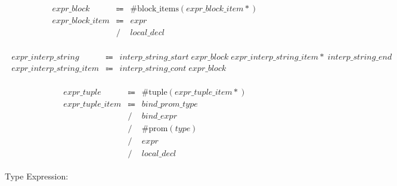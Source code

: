 \begin{align*}
    \begin{array}{rcll}
        \mathit{expr\_block}
        &\Coloneq &\mathrm{\#block\_items}(\mathit{expr\_block\_item}{*}) \\
        \mathit{expr\_block\_item}
        &\Coloneq &\mathit{expr} \\
        &\mathrel{/} &\mathit{local\_decl}
    \end{array}
\end{align*}

\begin{align*}
    \begin{array}{rcll}
        \mathit{expr\_interp\_string}
        &\Coloneq &\mathit{interp\_string\_start}\; \mathit{expr\_block}\; \mathit{expr\_interp\_string\_item}{*}\; \mathit{interp\_string\_end} \\
        \mathit{expr\_interp\_string\_item}
        &\Coloneq &\mathit{interp\_string\_cont}\; \mathit{expr\_block}
    \end{array}
\end{align*}

\begin{align*}
    \begin{array}{rcll}
        \mathit{expr\_tuple}
        &\Coloneq &\mathrm{\#tuple}(\mathit{expr\_tuple\_item}{*}) \\
        \mathit{expr\_tuple\_item}
        &\Coloneq &\mathit{bind\_prom\_type} \\
        &\mathrel{/} &\mathit{bind\_expr} \\
        &\mathrel{/} &\mathrm{\#prom}(\mathit{type}) \\
        &\mathrel{/} &\mathit{expr} \\
        &\mathrel{/} &\mathit{local\_decl}
    \end{array}
\end{align*}

Type Expression:

